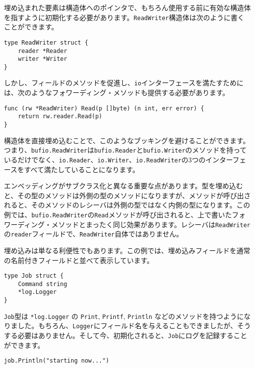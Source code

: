 \documentclass{jsarticle}
\begin{document}
埋め込まれた要素は構造体へのポインタで、もちろん使用する前に有効な構造体を指すように初期化する必要があります。\texttt{ReadWriter}構造体は次のように書くことができます。

\begin{lstlisting}[numbers=none]
type ReadWriter struct {
    reader *Reader
    writer *Writer
}
\end{lstlisting}

しかし、フィールドのメソッドを促進し、\texttt{io}インターフェースを満たすためには、次のようなフォワーディング・メソッドも提供する必要があります。

\begin{lstlisting}[numbers=none]
func (rw *ReadWriter) Read(p []byte) (n int, err error) {
    return rw.reader.Read(p)
}
\end{lstlisting}

構造体を直接埋め込むことで、このようなブッキングを避けることができます。つまり、\texttt{bufio.ReadWriter}は\texttt{bufio.Reader}と\texttt{bufio.Writer}のメソッドを持っているだけでなく、\texttt{io.Reader}、\texttt{io.Writer}、\texttt{io.ReadWriter}の3つのインターフェースをすべて満たしていることになります。

エンベッディングがサブクラス化と異なる重要な点があります。型を埋め込むと、その型のメソッドは外側の型のメソッドになりますが、メソッドが呼び出されると、そのメソッドのレシーバは外側の型ではなく内側の型になります。この例では、\texttt{bufio.ReadWriter}の\texttt{Read}メソッドが呼び出されると、上で書いたフォワーディング・メソッドとまったく同じ効果があります。レシーバは\texttt{ReadWriter}の\texttt{reader}フィールドで、\texttt{ReadWriter}自体ではありません。

埋め込みは単なる利便性でもあります。この例では、埋め込みフィールドを通常の名前付きフィールドと並べて表示しています。

\begin{lstlisting}[numbers=none]
type Job struct {
    Command string
    *log.Logger
}
\end{lstlisting}

\texttt{Job}型は \texttt{*log.Logger} の \texttt{Print},
\texttt{Printf}, \texttt{Println}
などのメソッドを持つようになりました。もちろん、\texttt{Logger}にフィールド名を与えることもできましたが、そうする必要はありません。そして今、初期化されると、\texttt{Job}にログを記録することができます。

\begin{lstlisting}[numbers=none]
job.Println("starting now...")
\end{lstlisting}
\end{document}
